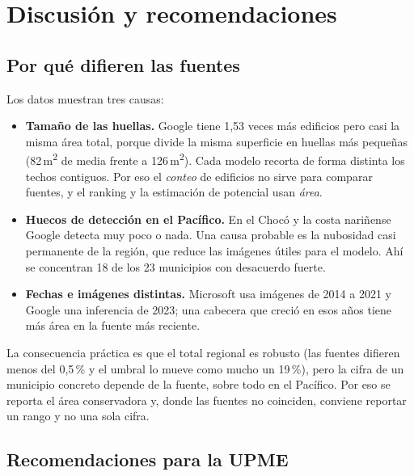 \section{Discusión y recomendaciones}
\label{sec:discusion}

\subsection{Por qué difieren las fuentes}

Los datos muestran tres causas:

\begin{itemize}
  \item \textbf{Tamaño de las huellas.} Google tiene 1,53 veces más edificios
        pero casi la misma área total, porque divide la misma superficie en
        huellas más pequeñas (82\,m\textsuperscript{2} de media frente a
        126\,m\textsuperscript{2}). Cada modelo recorta de forma distinta los
        techos contiguos. Por eso el \emph{conteo} de edificios no sirve para
        comparar fuentes, y el ranking y la estimación de potencial usan
        \emph{área}.
  \item \textbf{Huecos de detección en el Pacífico.} En el Chocó y la costa
        nariñense Google detecta muy poco o nada. Una causa probable es la
        nubosidad casi permanente de la región, que reduce las imágenes
        útiles para el modelo. Ahí se concentran 18 de los 23 municipios con
        desacuerdo fuerte.
  \item \textbf{Fechas e imágenes distintas.} Microsoft usa imágenes de 2014
        a 2021 y Google una inferencia de 2023; una cabecera que creció en
        esos años tiene más área en la fuente más reciente.
\end{itemize}

La consecuencia práctica es que el total regional es robusto (las fuentes
difieren menos del 0,5\,\% y el umbral lo mueve como mucho un 19\,\%), pero la
cifra de un municipio concreto depende de la fuente, sobre todo en el
Pacífico. Por eso se reporta el área conservadora y, donde las fuentes no
coinciden, conviene reportar un rango y no una sola cifra.

\subsection{Recomendaciones para la UPME}
\label{sec:recomendaciones}

